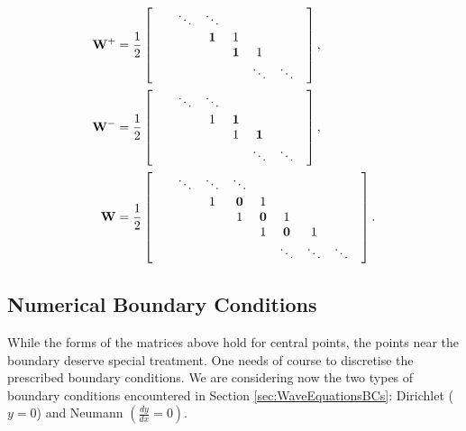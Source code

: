 \documentclass[11pt,twoside,a4paper,english]{book}
\begin{document}
\begin{subequations}
\begin{align}
{\bf W}^+  &= \frac{1}{2}\begin{bmatrix}
& & {\bf \ddots}  & \ddots & & & \\ 
& & & {\bf 1} & 1 & & &\\
& & & & {\bf 1} & 1 & & \\
& & & & & \ddots & \ddots & \\
\end{bmatrix}, \\
{\bf W}^-  &= \frac{1}{2}\begin{bmatrix}
& & \ddots  & \ddots & & & \\ 
& & & 1 & {\bf 1} & & &\\
& & & & 1 & {\bf 1} & & \\
& & & & & \ddots & \ddots & \\
\end{bmatrix}, \\
{\bf W} &= \frac{1}{2 }\begin{bmatrix}
& & \ddots  & \ddots & \ddots & & & &\\ 
& & & 1 & {\bf 0} & 1 & & & &\\
& & & & 1 & {\bf 0 } & 1 &  & &\\
& & & & & 1 & {\bf 0 } & 1 &  & \\
& & & & & & \ddots & \ddots &  \ddots & \\
\end{bmatrix}.
\end{align}
\end{subequations}


\subsection{Numerical Boundary Conditions}\label{sec:WEQNmatrices}


While the forms of the matrices above hold for central points, the points near the boundary deserve special treatment. One needs of course to discretise the prescribed boundary conditions. We are considering now the two types of boundary conditions encountered in Section \ref{sec:WaveEquationsBCs}: Dirichlet ($y=0$) and Neumann $\left(\frac{dy}{dx}=0\right)$. 
\end{document}

